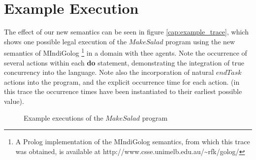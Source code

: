 \section{Example Execution}

The effect of our new semantics can be seen in figure \ref{cap:example_trace},
which shows one possible legal execution of the $MakeSalad$ program
using the new semantics of MIndiGolog%
\footnote{A Prolog implementation of the MIndiGolog semantics, from which this
trace was obtained, is available at http://www.csse.unimelb.edu.au/\textasciitilde{}rfk/golog/%
} in a domain with thee agents. Note the occurrence of several actions
within each \textbf{do} statement, demonstrating the integration of
true concurrency into the language. Note also the incorporation of
natural $endTask$ actions into the program, and the explicit occurrence
time for each action. (in this trace the occurrence times have been
instantiated to their earliest possible value).

%
\begin{figure*}[t]
 \centering {} 

\caption{Example executions of the $MakeSalad$ program}

\end{figure*}


